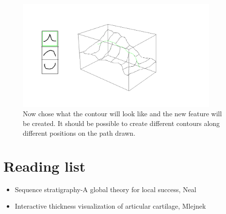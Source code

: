 \documentclass[12pt,a4paper]{article}
\begin{document}
\begin{itemize}
\begin{figure}
\centering
\includegraphics[width=4in]{createRidge1}
\caption[]{
  \footnotesize
  Now chose what the contour will look like and the new feature will be created. It should be possible to create different contours along different positions on the path drawn. 
  \label{fig:createRidge1}
}
\end{figure}

\clearpage

\section*{Reading list}
\begin{itemize}
 \item Sequence stratigraphy-A global theory for local success, Neal
 \item Interactive thickness visualization of articular cartilage, Mlejnek
\end{itemize}
\end{itemize}
\end{document}
